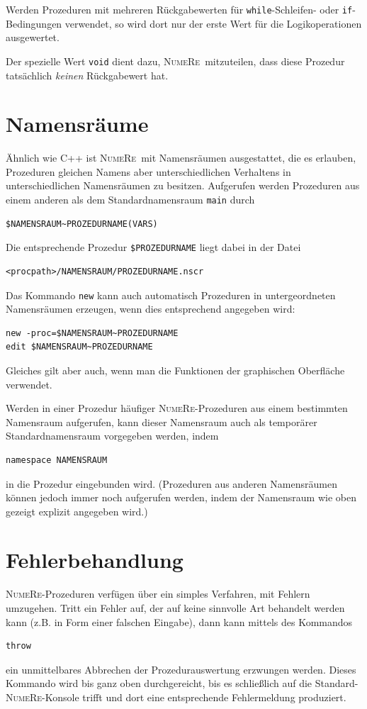 \documentclass[DIV=14,headsepline,footsepline]{scrbook}
\newcommand{\NR}{\textsc{Nu\-me\-Re}}
\begin{document}
				Werden Prozeduren mit mehreren Rückgabewerten für \verb+while+-Schleifen- oder \verb+if+-Bedingungen verwendet, so wird dort nur der erste Wert für die Logikoperationen ausgewertet.
				
				Der spezielle Wert \verb+void+ dient dazu, \NR\ mitzuteilen, dass diese Prozedur tatsächlich \emph{keinen} Rückgabewert hat.
			\section{Namensräume}
				Ähnlich wie C++ ist \NR\ mit Namensräumen ausgestattet, die es erlauben, Prozeduren gleichen Namens aber unterschiedlichen Verhaltens in unterschiedlichen Namensräumen zu besitzen. Aufgerufen werden Prozeduren aus einem anderen als dem Standardnamensraum \verb+main+ durch 
				\begin{lstlisting}
$NAMENSRAUM~PROZEDURNAME(VARS)
				\end{lstlisting}
				Die entsprechende Prozedur \verb+$PROZEDURNAME+ liegt dabei in der Datei 
				\begin{lstlisting}
<procpath>/NAMENSRAUM/PROZEDURNAME.nscr
				\end{lstlisting}
				Das Kommando \verb+new+ kann auch automatisch Prozeduren in untergeordneten Namensräumen erzeugen, wenn dies entsprechend angegeben wird:
				\begin{lstlisting}
new -proc=$NAMENSRAUM~PROZEDURNAME
edit $NAMENSRAUM~PROZEDURNAME
				\end{lstlisting}
				Gleiches gilt aber auch, wenn man die Funktionen der graphischen Oberfläche verwendet.
				
				Werden in einer Prozedur häufiger \NR-Prozeduren aus einem bestimmten Namensraum aufgerufen, kann dieser Namensraum auch als temporärer Standardnamensraum vorgegeben werden, indem
				\begin{lstlisting}
namespace NAMENSRAUM
				\end{lstlisting}
				in die Prozedur eingebunden wird. (Prozeduren aus anderen Namensräumen können jedoch immer noch aufgerufen werden, indem der Namensraum wie oben gezeigt explizit angegeben wird.)
			\section{Fehlerbehandlung}
				\NR-Prozeduren verfügen über ein simples Verfahren, mit Fehlern umzugehen. Tritt ein Fehler auf, der auf keine sinnvolle Art behandelt werden kann (z.B. in Form einer falschen Eingabe), dann kann mittels des Kommandos
				\begin{lstlisting}
throw
				\end{lstlisting}
				ein unmittelbares Abbrechen der Prozedurauswertung erzwungen werden. Dieses Kommando wird bis ganz oben durchgereicht, bis es schließlich auf die Standard-\NR-Konsole trifft und dort eine entsprechende Fehlermeldung produziert.
				
\end{document}
